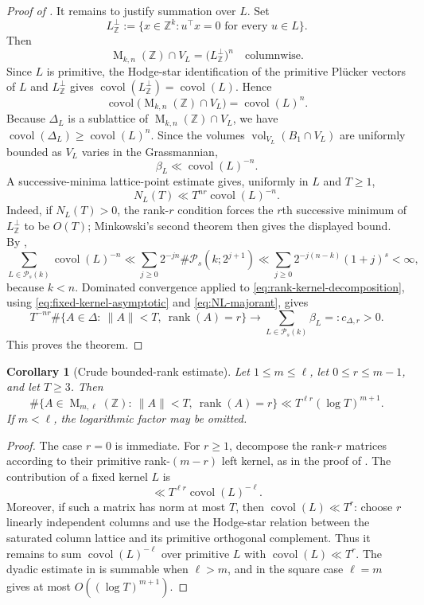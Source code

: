 \documentclass[reqno,11pt]{amsart}
\numberwithin{equation}{section}
\newtheorem{corollary}[theorem]{Corollary}
\theoremstyle{definition}
\theoremstyle{remark}
\newcommand{\op}{\operatorname}
\newcommand{\rank}{\op{rank}}
\newcommand{\vol}{\op{vol}}
\newcommand{\M}{\op{M}}
\newcommand{\covol}{\op{covol}}
\begin{document}
\begin{proof}[Proof of ]
It remains to justify summation over $L$. Set
$$
L^{\perp}_{\mathbb Z}
:=
\{x\in\mathbb Z^k:u^{\intercal}x=0\text{ for every }u\in L\}.
$$
Then
$$
\M_{k,n}(\mathbb Z)\cap V_L
=
\bigl(L^{\perp}_{\mathbb Z}\bigr)^n
\quad\text{columnwise}.
$$
Since $L$ is primitive, the Hodge-star identification of the primitive
Pl\"ucker vectors of $L$ and $L^{\perp}_{\mathbb Z}$ gives
$\covol(L^{\perp}_{\mathbb Z})=\covol(L)$. Hence
$$
\covol\bigl(\M_{k,n}(\mathbb Z)\cap V_L\bigr)
=
\covol(L)^n.
$$
Because $\Delta_L$ is a sublattice of
$\M_{k,n}(\mathbb Z)\cap V_L$, we have
$\covol(\Delta_L)\ge\covol(L)^n$. Since the volumes
$\vol_{V_L}(B_1\cap V_L)$ are uniformly bounded as $V_L$ varies in the
Grassmannian,
\begin{equation}\label{eq:beta-majorant}
\beta_L\ll\covol(L)^{-n}.
\end{equation}
A successive-minima lattice-point estimate gives, uniformly in $L$ and $T\ge1$,
\begin{equation}\label{eq:NL-majorant}
N_L(T)
\ll
T^{nr}\covol(L)^{-n}.
\end{equation}
Indeed, if $N_L(T)>0$, the rank-$r$ condition forces the $r$th successive
minimum of $L_{\mathbb Z}^{\perp}$ to be $O(T)$; Minkowski's second theorem
then gives the displayed bound.
By ,
$$
\sum_{L\in\mathcal P_s(k)}\covol(L)^{-n}
\ll
\sum_{j\ge0}
2^{-jn}\#\mathcal P_s(k;2^{j+1})
\ll
\sum_{j\ge0}2^{-j(n-k)}(1+j)^s
<
\infty,
$$
because $k<n$. Dominated convergence applied to
\eqref{eq:rank-kernel-decomposition}, using
\eqref{eq:fixed-kernel-asymptotic} and \eqref{eq:NL-majorant}, gives
$$
T^{-nr} \#\{A\in\Delta:\ \|A\|< T,\ \rank(A)=r\}
\to
\sum_{L\in\mathcal P_s(k)}\beta_L
=:
c_{\Delta,r}>0.
$$
This proves the theorem.
\end{proof}


\begin{corollary}[Crude bounded-rank estimate]
\label{cor:crude-bounded-rank}
Let $1\le m\le \ell$, let $0\le r\le m-1$, and let $T\ge3$. Then
$$
\#\{A\in\M_{m,\ell}(\mathbb Z):\ \|A\|< T,\ \rank(A)=r\}
\ll
T^{\ell r}(\log T)^{m+1}.
$$
If $m<\ell$, the logarithmic factor may be omitted.
\end{corollary}

\begin{proof}
The case $r=0$ is immediate. For $r\ge1$, decompose the rank-$r$
matrices according to their primitive rank-$(m-r)$ left kernel, as in the
proof of . The contribution of a fixed kernel $L$ is
$$
\ll T^{\ell r}\covol(L)^{-\ell}.
$$
Moreover, if such a matrix has norm at most $T$, then $\covol(L)\ll T^r$:
choose $r$ linearly independent columns and use the Hodge-star relation
between the saturated column lattice and its primitive orthogonal complement.
Thus it remains to sum $\covol(L)^{-\ell}$ over primitive $L$ with
$\covol(L)\ll T^r$. The dyadic estimate in  is summable when
$\ell>m$, and in the square case $\ell=m$ gives at most
$O((\log T)^{m+1})$.
\end{proof}
\end{document}
